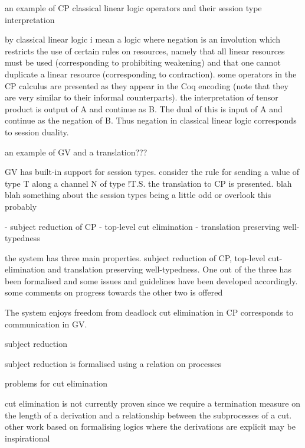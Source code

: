 \documentclass{beamer}
\begin{document}
\begin{frame}
an example of CP classical linear logic operators and their session type
interpretation
\end{frame}

by classical linear logic i mean a logic where negation is an involution which
restricts the use of certain rules on resources, namely that all linear
resources must be used (corresponding to prohibiting weakening) and that one
cannot duplicate a linear resource (corresponding to contraction). some
operators in the CP calculus are presented as they appear in the Coq encoding
(note that they are very similar to their informal counterparts). the
interpretation of tensor product is output of A and continue as B. The dual of
this is input of A and continue as the negation of B. Thus negation in
classical linear logic corresponds to session duality.

\begin{frame}
an example of GV and a translation???
\end{frame}

GV has built-in support for session types. consider the rule for sending a
value of type T along a channel N of type !T.S. the translation to CP is
presented. blah blah something about the session types being a little odd or
overlook this probably

\begin{frame}
- subject reduction of CP
- top-level cut elimination
- translation preserving well-typedness
\end{frame}

the system has three main properties. subject reduction of CP, top-level
cut-elimination and translation preserving well-typedness. One out of the
three has been formalised and some issues and guidelines have been developed
accordingly. some comments on progress towards the other two is offered

The system enjoys freedom from deadlock cut elimination in CP corresponds to
communication in GV.

\begin{frame}
subject reduction
\end{frame}

subject reduction is formalised using a relation on processes

\begin{frame}
problems for cut elimination
\end{frame}

cut elimination is not currently proven since we require a termination measure
on the length of a derivation and a relationship between the subprocesses of a
cut. other work based on formalising logics where the derivations are explicit
may be inspirational
\end{document}
